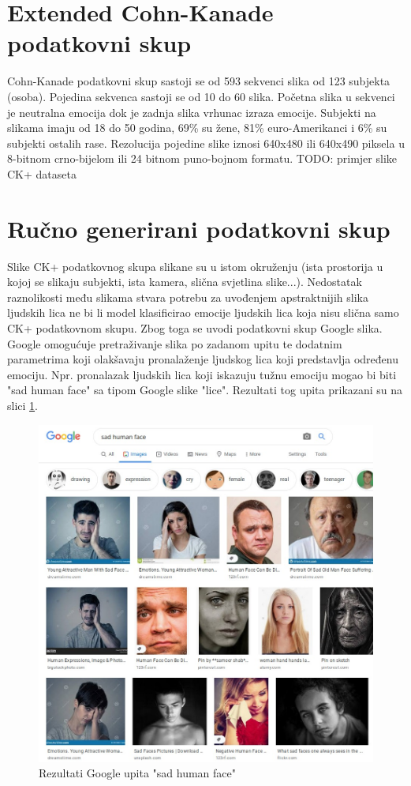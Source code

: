 \documentclass[times, utf8, zavrsni,numeric,pstricks]{fer}
\begin{document}
\section{Extended Cohn-Kanade podatkovni skup}

Cohn-Kanade podatkovni skup sastoji se od 593 sekvenci slika od 123 subjekta (osoba). Pojedina sekvenca sastoji se od 10 do 60 slika. Početna slika u sekvenci je neutralna emocija dok je zadnja slika vrhunac izraza emocije. Subjekti na slikama imaju od 18 do 50 godina, 69\% su žene, 81\% euro-Amerikanci i 6\% su subjekti ostalih rase. Rezolucija pojedine slike iznosi 640x480 ili 640x490 piksela u 8-bitnom crno-bijelom ili 24 bitnom puno-bojnom formatu\cite{ck}. TODO: primjer slike CK+ dataseta

\section{Ručno generirani podatkovni skup}
Slike CK+ podatkovnog skupa slikane su u istom okruženju (ista prostorija u kojoj se slikaju subjekti, ista kamera, slična svjetlina slike...). Nedostatak raznolikosti među slikama stvara potrebu za uvođenjem apstraktnijih slika ljudskih lica ne bi li model klasificirao emocije ljudskih lica koja nisu slična samo CK+ podatkovnom skupu. Zbog toga se uvodi podatkovni skup Google slika. Google omogućuje pretraživanje slika po zadanom upitu te dodatnim parametrima koji olakšavaju pronalaženje ljudskog lica koji predstavlja određenu emociju. Npr. pronalazak ljudskih lica koji iskazuju tužnu emociju mogao bi biti "sad human face" sa tipom Google slike "lice". Rezultati tog upita prikazani su na slici \ref{pic:google_search_sad}.

\begin{figure}[H]
	\includegraphics[width=\linewidth]{2020-06-08-22-16-22.jpeg}
	\caption{Rezultati Google upita "sad human face"}
	\label{pic:google_search_sad}
\end{figure}
\end{document}
